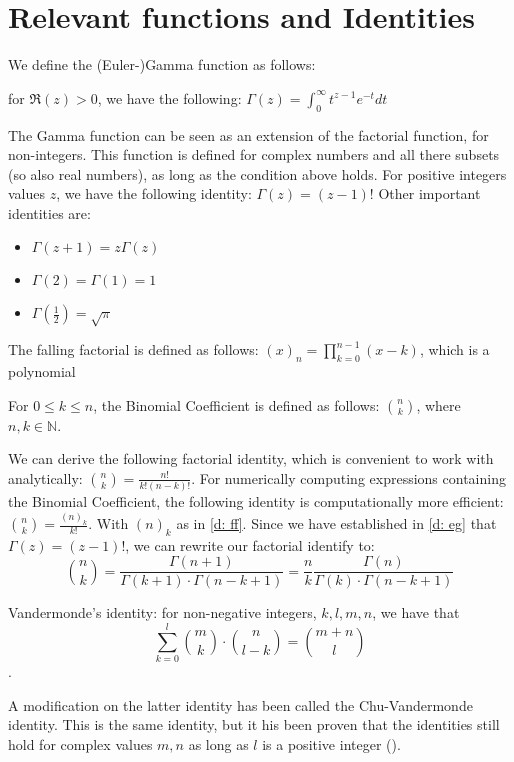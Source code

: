 \section{Relevant functions and Identities}\label{s:appendices}
We define the (Euler-)Gamma function as follows:
\begin{definition}\label{d: eg}
    for \(\Re(z) > 0\), we have the following: \(\Gamma(z) = \int_{0}^{\infty} t^{z-1} e^{-t} dt\)
\end{definition}

The Gamma function can be seen as an extension of the factorial function, for non-integers. This function is defined for complex numbers and all there subsets (so also real numbers), as long as the condition above holds. For positive integers values \(z\), we have the following identity: \(\Gamma(z) = (z - 1)!\)
Other important identities are: 
\begin{itemize}
    \item \(\Gamma(z + 1) = z \Gamma(z)\)
    \item \(\Gamma(2) = \Gamma(1) = 1\)
    \item \(\Gamma(\frac{1}{2}) = \sqrt{\pi}\)
\end{itemize}

\begin{definition}\label{d: ff}
    The falling factorial is defined as follows: \((x)_n = \prod_{k = 0}^{n - 1} (x - k)\), which is a polynomial
\end{definition}
\begin{definition}
    For \(0 \leq k \leq n\), the Binomial Coefficient is defined as follows: \(\binom{n}{k}\), where \(n, k \in \mathbb{N}\).
\end{definition}
We can derive the following factorial identity, which is convenient to work with analytically: \(\binom{n}{k} = \frac{n!}{k! (n - k)!}\).
For numerically computing expressions containing the Binomial Coefficient, the following identity is computationally more efficient: \(\binom{n}{k} = \frac{(n)_k}{k!}\). With \((n)_k\) as in \ref{d: ff}.
Since we have established in \ref{d: eg} that \(\Gamma(z) = (z - 1)!\), we can rewrite our factorial identify to:
\[\binom{n}{k} = \frac{\Gamma(n + 1)}{\Gamma(k + 1) \cdot \Gamma( n - k  + 1)} = \frac{n}{k}\frac{\Gamma(n)}{\Gamma(k) \cdot \Gamma(n - k + 1)}\]

\begin{definition}
    Vandermonde's identity: for non-negative integers, \(k, l, m, n\), we have that \[\sum_{k = 0}^{l} \binom{m}{k} \cdot \binom{n}{l - k} = \binom{m + n}{l}\].
\end{definition}
A modification on the latter identity has been called the Chu-Vandermonde identity. This is the same identity, but it his been proven that the identities still hold for complex values \(m, n\) as long as \(l\) is a positive integer (\cite{askey75}).